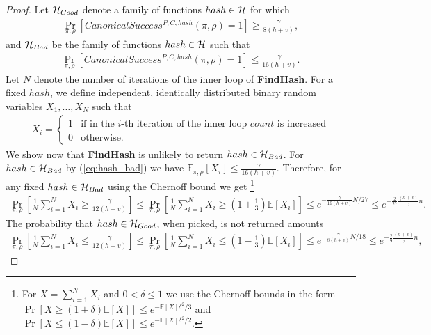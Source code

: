\begin{proof}
Let $\mathcal{H}_{Good}$ denote a family of functions $hash \in \mathcal{H}$ for which
\begin{align}
  \label{eq:hash_good}
\underset{\pi, \rho}{\Pr}\left[CanonicalSuccess^{P, C, hash}(\pi, \rho) = 1\right] \geq \frac{\gamma}{8(h+v)},
\end{align}
and $\mathcal{H}_{Bad}$ be the family of functions $hash \in \mathcal{H}$ such that
\begin{align}
  \label{eq:hash_bad}
\underset{\pi, \rho}{\Pr}\left[CanonicalSuccess^{P, C, hash}(\pi, \rho) = 1\right] \leq \frac{\gamma}{16(h+v)}.
\end{align}
%
Let $N$ denote the number of iterations of the inner loop of \textbf{FindHash}.
For a fixed $hash$, we define independent, identically distributed binary random variables $X_1, \dots, X_{N}$ such that
\begin{align*}
  X_i =
  \begin{cases}
    1 & \text{if in the $i$-th iteration of the inner loop $count$ is increased}\\
    0 & \text{otherwise.}
  \end{cases}
\end{align*}
We show now that \textbf{FindHash} is unlikely to return $hash \in \mathcal{H}_{Bad}$.
For $hash \in \mathcal{H}_{Bad}$ by (\ref{eq:hash_bad}) we have $\mathbb{E}_{{\pi}, \rho}[X_i] \leq \frac{\gamma}{16(h+v)}$.
Therefore, for any fixed $hash \in \mathcal{H}_{Bad}$ using the Chernoff bound we get
\footnote{For $X = \sum_{i=1}^N X_i$ and $0 < \delta \leq 1$ we use the Chernoff bounds in the form
$\Pr[X \geq (1+\delta) \mathbb{E}[X]] \leq e^{- \mathbb{E}[X] \delta^2/3}$ and
$\Pr[X \leq (1-\delta) \mathbb{E}[X]] \leq e^{- \mathbb{E}[X] \delta^2/2}$.}
\begin{align*}
  \underset{\pi,\rho}{\Pr} \left[\frac{1}{N} \sum_{i=1}^{N} X_i \geq \frac{\gamma}{12(h+v)} \right] \leq
  \underset{\pi, \rho}{\Pr}\left[\frac{1}{N} \sum_{i=1}^{N} X_i \geq (1 + \frac{1}{3}) \mathbb{E}[X_i]\right] \leq
  e^{-{\frac{\gamma}{16(h+v)}} N / 27} \leq e^{-\frac{2}{27}\frac{(h+v)}{\gamma}n}.
\end{align*}
%
The probability that $hash \in \mathcal{H}_{Good}$, when picked, is not returned amounts
\begin{align*}
  \underset{\pi, \rho}{\Pr}\left[\frac{1}{N} \sum_{i=1}^{N} X_i \leq \frac{\gamma}{12(h+v)}\right] \leq
  \underset{\pi, \rho}{\Pr}\left[\frac{1}{N} \sum_{i=1}^{N} X_i \leq (1 - \frac{1}{3})\mathbb{E}[X_i]\right]
  \leq e^{-{\frac{\gamma}{8(h+v)}} N / 18} \leq e^{-\frac{2}{9} \frac{(h+v)}{\gamma}n},
\end{align*}

\end{proof}
